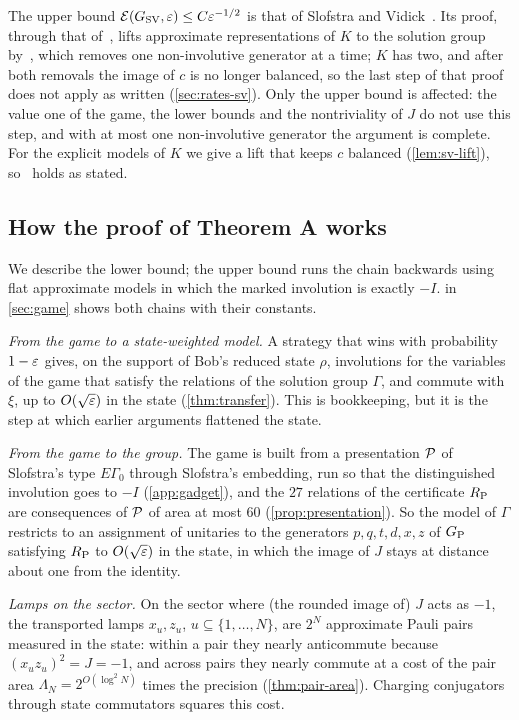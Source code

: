 The upper bound $\mathcal E(G_{\mathrm{SV}},\varepsilon)\le C\varepsilon^{-1/2}$ is that of Slofstra and Vidick~\cite[Thm.~1.1]{SV18}. Its proof, through that
of~\cite[Prop.~6.2]{SV18}, lifts approximate representations of $K$ to the solution group by~\cite[Prop.~4.8]{Slo19}, which removes one
non-involutive generator at a time; $K$ has two, and after both removals the image of $c$ is no longer balanced, so the last step of that
proof does not apply as written (\cref{sec:rates-sv}). Only the upper bound is affected: the value one of the game, the lower bounds and
the nontriviality of $J$ do not use this step, and with at most one non-involutive generator the argument is complete. For the explicit
models of $K$ we give a lift that keeps $c$ balanced (\cref{lem:sv-lift}), so~\cite[Thm.~1.1]{SV18} holds as stated.

\subsection{How the proof of Theorem A works}

We describe the lower bound; the upper bound runs the chain backwards using flat approximate models in which the marked involution is
exactly $-I$.  in \cref{sec:game}
shows both chains with their constants.

\emph{From the game to a state-weighted model.} A strategy that wins with probability $1-\varepsilon$ gives, on the support of Bob's reduced state
$\rho$, involutions for the variables of the game that satisfy the relations of the solution group $\Gamma$, and commute with $\xi$, up to
$O(\sqrt{\varepsilon})$ in the state (\cref{thm:transfer}). This is bookkeeping, but it is the step at which earlier arguments flattened the state.

\emph{From the game to the group.} The game is built from a presentation $\mathcal P$ of Slofstra's type $E\Gamma_0$ through Slofstra's
embedding, run so that the distinguished involution goes to $-I$ (\cref{app:gadget}), and the $27$ relations of the certificate $R_{\mathrm P}$ are
consequences of $\mathcal P$ of area at most $60$ (\cref{prop:presentation}). So the model of $\Gamma$ restricts to an assignment of unitaries to
the generators $p,q,t,d,x,z$ of $G_{\mathrm P}$ satisfying $R_{\mathrm P}$ to $O(\sqrt{\varepsilon})$ in the state, in which the image of $J$ stays at distance about one
from the identity.

\emph{Lamps on the sector.} On the sector where (the rounded image of) $J$ acts as $-1$, the transported lamps $x_u,z_u$, $u\subseteq\{1,\dots,N\}$,
are $2^N$ approximate Pauli pairs measured in the state: within a pair they nearly anticommute because $(x_uz_u)^2=J=-1$, and across pairs
they nearly commute at a cost of the pair area $\Lambda_N=2^{O(\log^2N)}$ times the precision (\cref{thm:pair-area}). Charging conjugators
through state commutators squares this cost.

